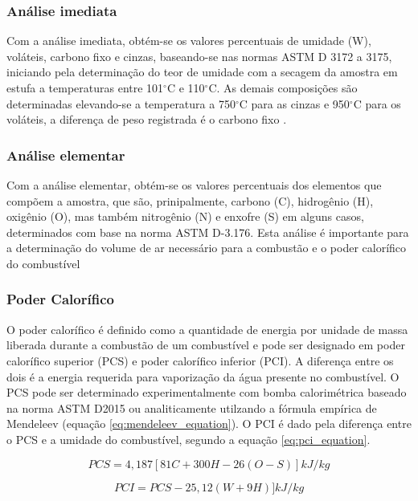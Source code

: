 \subsubsection{Análise imediata}

Com a análise imediata, obtém-se os valores percentuais de umidade (W), voláteis, carbono fixo e cinzas, baseando-se nas normas ASTM D 3172 a 3175, iniciando pela determinação do teor de umidade com a secagem da amostra em estufa a temperaturas entre 101$^{\circ}$C e 110$^{\circ}$C. As demais composições são determinadas elevando-se a temperatura a 750$^{\circ}$C para as cinzas e 950$^{\circ}$C para os voláteis, a diferença de peso registrada é o carbono fixo \cite{sanchez2010}.

\subsubsection{Análise elementar}

Com a análise elementar, obtém-se os valores percentuais dos elementos que compõem a amostra, que são, prinipalmente, carbono (C), hidrogênio (H), oxigênio (O), mas também nitrogênio (N) e enxofre (S) em alguns casos, determinados com base na norma ASTM D-3.176. Esta análise é importante para a determinação do volume de ar necessário para a combustão e o poder calorífico do combustível \cite{biomassacortez}

\subsubsection{Poder Calorífico}

O poder calorífico é definido como a quantidade de energia por unidade de massa liberada durante a combustão de um combustível e pode ser designado em poder calorífico superior (PCS) e poder calorífico inferior (PCI). A diferença entre os dois é a energia requerida para vaporização da água presente no combustível. O PCS pode ser determinado experimentalmente com bomba calorimétrica baseado na norma ASTM D2015 ou analiticamente utilzando a fórmula empírica de Mendeleev (equação \ref{eq:mendeleev_equation}). O PCI é dado pela diferença entre o PCS e a umidade do combustível, segundo a equação \ref{eq:pci_equation}.

\begin{equation} \label{eq:mendeleev_equation}
PCS = 4,187 [81C + 300H - 26(O - S)] kJ/kg
\end{equation}

\begin{equation} \label{eq:pci_equation}
PCI = PCS - 25,12(W + 9H)] kJ/kg
\end{equation}


